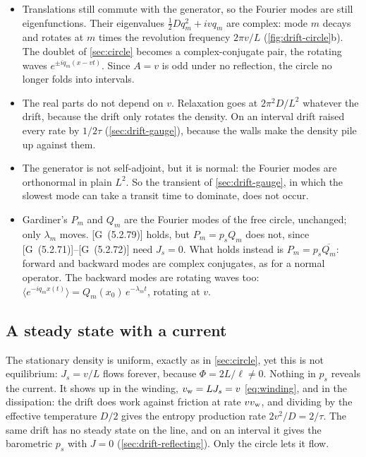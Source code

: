 \documentclass[11pt]{article}
\numberwithin{equation}{section}
\newcommand{\avg}[1]{\langle #1\rangle}
\newcommand{\G}[1]{[G~(#1)]}
\begin{document}
\begin{itemize}
  \item Translations still commute with the generator, so the Fourier modes are still eigenfunctions. Their
        eigenvalues $\tfrac12Dq_m^2+ivq_m$ are complex: mode $m$ decays and rotates at $m$ times the
        revolution frequency $2\pi v/L$ (\cref{fig:drift-circle}b). The doublet of \cref{sec:circle} becomes a
        complex-conjugate pair, the rotating waves $e^{\pm iq_m(x-vt)}$. Since $A=v$ is odd under no reflection,
        the circle no longer folds into intervals.
  \item The real parts do not depend on $v$. Relaxation goes at $2\pi^2D/L^2$ whatever the drift, because the
        drift only rotates the density. On an interval drift raised every rate by $1/2\tau$
        (\cref{sec:drift-gauge}), because the walls make the density pile up against them.
  \item The generator is not self-adjoint, but it is normal: the Fourier modes are orthonormal in plain $L^2$.
        So the transient of \cref{sec:drift-gauge}, in which the slowest mode can take a transit time to
        dominate, does not occur.
  \item Gardiner's $P_m$ and $Q_m$ are the Fourier modes of the free circle, unchanged; only $\lambda_m$ moves.
        \G{5.2.79} holds, but $P_m=p_sQ_m$ does not, since \G{5.2.71}--\G{5.2.72} need $J_s=0$. What holds instead is
        $P_m=p_s\overline{Q_m}$: forward and backward modes are complex conjugates, as for a normal operator. The
        backward modes are rotating waves
        too: $\avg{e^{-iq_mx(t)}}=Q_m(x_0)\,e^{-\lambda_mt}$, rotating at $v$.
\end{itemize}

\subsection{A steady state with a current}

The stationary density is uniform, exactly as in \cref{sec:circle}, yet this is not equilibrium: $J_s=v/L$
flows forever, because $\Phi=2L/\ell\neq0$. Nothing in $p_s$ reveals the current. It shows up in the winding,
$v_{\rm w}=LJ_s=v$ \cref{eq:winding}, and in the dissipation: the drift does work against friction at rate
$vv_{\rm w}$, and
dividing by the effective temperature $D/2$ gives the entropy production rate $2v^2/D=2/\tau$. The same drift
has no steady state on the line, and on an interval it gives the barometric $p_s$ with $J=0$
(\cref{sec:drift-reflecting}). Only the circle lets it flow.
\end{document}
